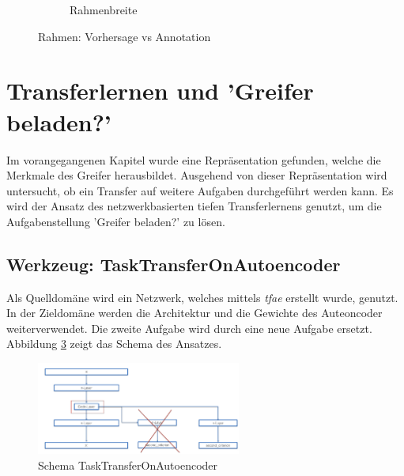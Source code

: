 \begin{figure}[h]
\begin{subfigure}[c]{0.32\textwidth}
			\caption{Rahmenbreite}
			\label{img:Rahmenbreite}	
		\end{subfigure}
		\caption{Rahmen: Vorhersage vs Annotation}
		\label{img:FehlerursacheMTLGrapple}
	\end{figure}
	
	
	\section{Transferlernen und 'Greifer beladen?'}
	\label{sec:TransferLearningGrappleLoaded}
	Im vorangegangenen Kapitel wurde eine Repräsentation gefunden, welche die Merkmale des Greifer herausbildet. Ausgehend von dieser Repräsentation wird untersucht, ob ein Transfer auf weitere Aufgaben durchgeführt werden kann. Es wird der Ansatz des netzwerkbasierten tiefen Transferlernens genutzt, um die Aufgabenstellung 'Greifer beladen?' zu lösen.
	
	\subsection{Werkzeug: TaskTransferOnAutoencoder}
	\label{sec:TransferSecondCriterionAutoenocder}		
	Als Quelldomäne wird ein Netzwerk, welches mittels \textit{\ac{tfae}} erstellt wurde, genutzt. In der Zieldomäne werden die Architektur und die Gewichte des Auteoncoder weiterverwendet. Die zweite Aufgabe wird durch eine neue Aufgabe ersetzt. Abbildung \ref{img:SchemaTTAE} zeigt das Schema des Ansatzes. 
	\begin{figure}[h]
		\centering
		\includegraphics[width=0.6\textwidth, center]{bilder/Schema_Autoencoders/Schema_TSCAE.png}
		\caption[Schema TaskTransferOnAutoencoder]{Schema TaskTransferOnAutoencoder}
		\label{img:SchemaTTAE}
	\end{figure}

